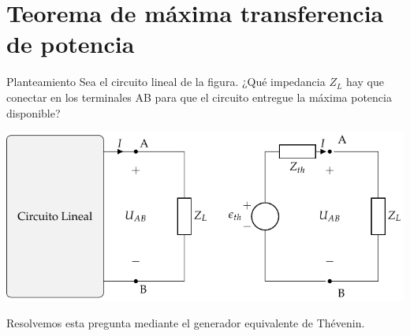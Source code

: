 \documentclass[aspectratio=169, usenames,svgnames,dvipsnames]{beamer}
\begin{document}
\section{Teorema de máxima transferencia de potencia}
\label{sec:org2ed502b}

\begin{frame}[label={sec:org9929717}]{Planteamiento}
Sea el circuito lineal de la figura. ¿Qué impedancia \(Z_L\) hay que conectar en los terminales AB para que el circuito entregue la máxima potencia disponible?

\begin{center}
\includegraphics[height=0.55\textheight]{../figs/EquivalenteThevenin.pdf}
\end{center}

Resolvemos esta pregunta mediante el generador equivalente de Thévenin.
\end{frame}
\end{document}
